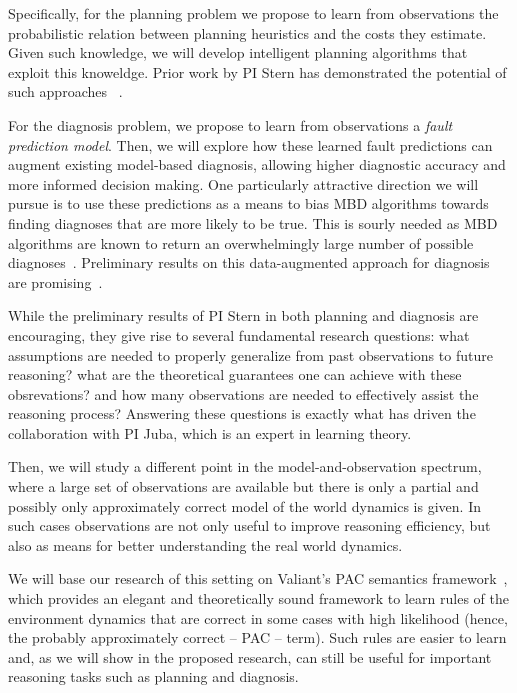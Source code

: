 Specifically, for the planning problem we propose to learn from observations the probabilistic relation between planning heuristics and the costs they estimate. Given such knowledge, we will develop intelligent planning algorithms that exploit this knoweldge. Prior work by PI Stern has demonstrated the potential of such approaches~
\cite{stern2011probably,stern2012exploring,stern2014potential}. 

For the diagnosis problem, we propose to learn from observations 
a {\em fault prediction model}. Then, we will explore how these learned fault predictions can augment existing model-based diagnosis, allowing higher diagnostic accuracy and more informed decision making. One particularly attractive direction we will pursue is to use these predictions as a means to bias MBD algorithms towards finding diagnoses that are more likely to be true. This is sourly needed as MBD algorithms are known to return an overwhelmingly large number of possible diagnoses~\cite{stern2015many}. Preliminary results on this data-augmented approach for diagnosis are promising~\cite{elmishali2016dataAugmented}. 

While the preliminary results of PI Stern in both planning and diagnosis are encouraging, they give rise to several fundamental research questions: what assumptions are needed to properly generalize from past observations to future reasoning? what are the theoretical guarantees one can achieve with these obsrevations? and how many observations are needed to effectively assist the reasoning process? Answering these questions is exactly what has driven the collaboration with PI Juba, which is an expert in learning theory. 



Then, we will study a different point in the model-and-observation spectrum, where a large set of observations are available but there is only a partial and possibly only approximately correct model of the world dynamics is given. In such cases observations are not only useful to improve reasoning efficiency, but also as means for better understanding the real world dynamics. 

We will base our research of this setting on Valiant's PAC semantics framework~\cite{valiant2000robustLogics,valiant2000neuroidal}, which provides an elegant and theoretically sound framework to learn 
rules of the environment dynamics that are correct in some cases with high likelihood (hence, the probably approximately correct -- PAC -- term). 
Such rules are easier to learn and, as we will show in the proposed research, can still be useful for important reasoning tasks such as planning and diagnosis. 

